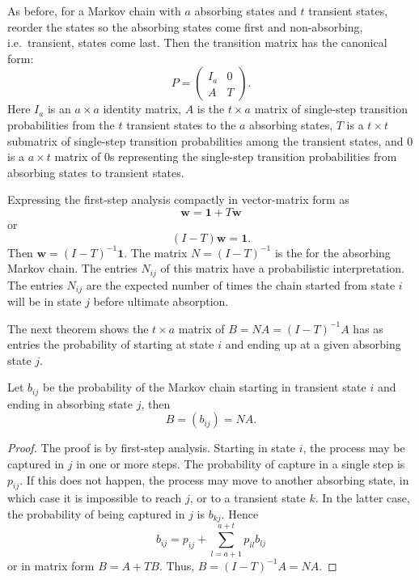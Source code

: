 \documentclass[12pt]{article}
\begin{document}
As before, for a Markov chain with \( a \) absorbing states and \( t \)
transient states, reorder the states so the absorbing states come first
and non-absorbing, i.e.\ transient, states come last.  Then the
transition matrix has the canonical form:
\[
    P =
    \begin{pmatrix}
        I_a & 0 \\
        A & T
    \end{pmatrix}
    .
\] Here \( I_{a} \) is an \( a \times a \) identity matrix, \( A \) is
the \( t \times a \) matrix of single-step transition probabilities from
the \( t \) transient states to the \( a \) absorbing states, \( T \) is
a \( t \times t \) submatrix of single-step transition probabilities
among the transient states, and \( 0 \) is a \( a \times t \) matrix of \(
0 \)s representing the single-step transition probabilities from
absorbing states to transient states.

Expressing the first-step analysis compactly in vector-matrix form as
\[
    \mathbf{w} = \mathbf{1} + T \mathbf{w}
\] or
\[
    (I - T) \mathbf{w} = \mathbf{1}.
\] Then \( \mathbf{w} = (I-T)^{-1} \mathbf{1} \).  The matrix \( N = (I-T)^
{-1} \) is the %
for the absorbing Markov chain.  The entries \( N_{ij} \) of this matrix
have a probabilistic interpretation.  The entries \( N_{ij} \) are the
expected number of times the chain started from state \( i \) will be in
state \( j \) before ultimate absorption.

The next theorem shows the \( t \times a \) matrix of %
\( B = NA = (I-T)^{-1}A \) has as entries the probability of starting at
state \( i \) and ending up at a given absorbing state \( j \).

\begin{theorem}
    Let \( b_{ij} \) be the probability of the Markov chain starting in
    transient state \( i \) and ending in absorbing state \( j \), then
    \[
        B = ( b_{ij} ) = NA.
    \]
\end{theorem}

\begin{proof}
    The proof is by first-step analysis.  Starting in state \( i \), the
    process may be captured in \( j \) in one or more steps.  The
    probability of capture in a single step is \( p_{ij} \).  If this
    does not happen, the process may move to another absorbing state, in
    which case it is impossible to reach \( j \), or to a transient
    state \( k \).  In the latter case, the probability of being
    captured in \( j \) is \( b_{kj} \).  Hence
    \[
        b_{ij} = p_{ij} + \sum\limits_{l = a+1}^{a+t} p_{il} b_{lj}
    \] or in matrix form \( B = A + TB \).  Thus, \( B = (I-T)^{-1} A =
    NA \).
\end{proof}
\end{document}
